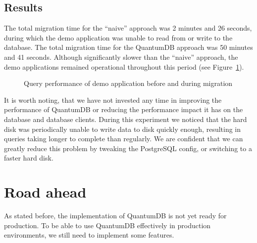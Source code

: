 \documentclass[conference]{IEEEtran}
\begin{document}
\subsection{Results}

The total migration time for the ``naive'' approach was 2 minutes and 26 seconds, during which the demo application was unable to read from or write to the database. The total migration time for the QuantumDB approach was 50 minutes and 41 seconds. Although significantly slower than the ``naive'' approach, the demo applications remained operational throughout this period (see Figure~\ref{fig:migration}).

\begin{figure}%
    \centering
    \qquad
    \caption{Query performance of demo application before and during migration}%
    \label{fig:migration}%
\end{figure}

It is worth noting, that we have not invested any time in improving the performance of QuantumDB or reducing the performance impact it has on the database and database clients. During this experiment we noticed that the hard disk was periodically unable to write data to disk quickly enough, resulting in queries taking longer to complete than regularly. We are confident that we can greatly reduce this problem by tweaking the PostgreSQL config, or switching to a faster hard disk.

\section{Road ahead}
As stated before, the implementation of QuantumDB is not yet ready for production. To be able to use QuantumDB effectively in production environments, we still need to implement some features. 
\end{document}
